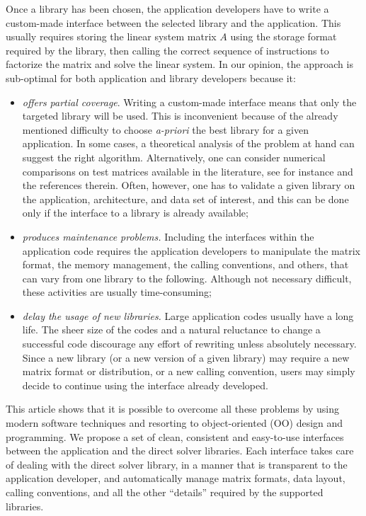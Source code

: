 \documentclass[acmtocl]{acmtrans2m}
\begin{document}
Once a library has been chosen, the application developers have to
write a custom-made interface between the selected library and
the application. This usually requires storing the linear system matrix $A$
using the
  storage format required by the library, then calling the correct sequence of
  instructions to factorize the matrix and solve the linear system.  In our
  opinion, the approach is sub-optimal for both application and library
  developers because it:
\begin{itemize}

\item 
{\sl offers partial coverage}. Writing a custom-made interface means that only the
targeted library will be used.
This is inconvenient because of the already mentioned difficulty to choose
{\sl a-priori} the best library for a given application.
In some cases, a theoretical analysis of
the problem at hand can suggest the right algorithm. Alternatively, one can
consider numerical comparisons on test matrices available in the literature,
see for instance \cite{amestoy01analysis,gupta01recent} and
the references therein. Often, however, one has to validate
a given library on the application, architecture, and data
set of interest, and this can be done only if the interface  to a library
is already available;

\item 
{\sl produces maintenance problems.}
Including the interfaces within the application code requires the application
developers to manipulate the matrix format, the memory
management, the calling conventions, and others, that can vary 
from one library to the following. Although not necessary difficult, these
activities are usually time-consuming;

\item 
{\sl delay the usage of new libraries.} 
Large application codes usually have a long life.  The sheer size of
the codes and a natural reluctance to change a successful code discourage any
effort of rewriting unless absolutely necessary.
Since a new library 
(or a new version of a given library) may require a new matrix format or
distribution, or a new calling convention, users may simply decide to continue
using the interface already developed.
\end{itemize}

This article shows that it is possible to overcome all these problems by using
modern software techniques and resorting to object-oriented (OO) design and
programming.  We propose a set of clean, consistent and easy-to-use interfaces
between the application and the direct solver libraries.  Each interface takes
care of dealing with the direct solver library, in a manner that is
transparent to the application developer, and automatically manage matrix
formats, data layout, calling conventions, and all the other ``details''
required by the supported libraries. 
\end{document}
